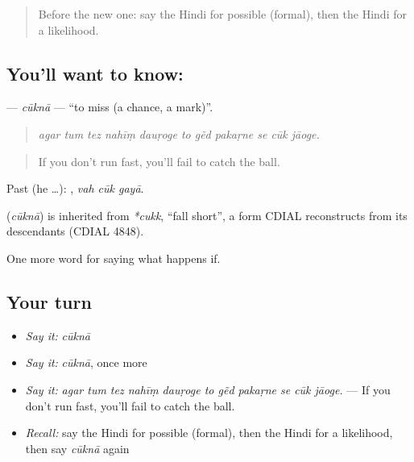 \label{lesson:HI-C373-cukna}



\begin{quote}
Before the new one: say the Hindi for possible (formal), then the Hindi for a likelihood.
\end{quote}

\subsection*{You'll want to know: }
\textbf{} — \emph{cūknā} — \textquotedblleft{}to miss (a chance, a mark)\textquotedblright{}.

\begin{quote}
          
\end{quote}

\begin{quote}
\emph{agar tum tez nahīṃ dauṛoge to gẽd pakaṛne se cūk jāoge.}
\end{quote}

\begin{quote}
If you don't run fast, you'll fail to catch the ball.
\end{quote}

Past (he …):   , \emph{vah cūk gayā}.

\begin{cousinweb}
\textbf{} (\emph{cūknā}) is inherited from \emph{*cukk}, \textquotedblleft{}fall short\textquotedblright{}, a form CDIAL reconstructs from its descendants (CDIAL 4848).
\end{cousinweb}

\begin{grammarlens}[title={What you've built}]
One more word for saying what happens if.
\end{grammarlens}

\subsection*{Your turn}
\begin{itemize}
\raggedright
  \item \emph{Say it:} \emph{cūknā}
  \item \emph{Say it:} \emph{cūknā}, once more
  \item \emph{Say it:} \emph{agar tum tez nahīṃ dauṛoge to gẽd pakaṛne se cūk jāoge.} — If you don't run fast, you'll fail to catch the ball.
  \item \emph{Recall:} say the Hindi for possible (formal), then the Hindi for a likelihood, then say \emph{cūknā} again
\end{itemize}

